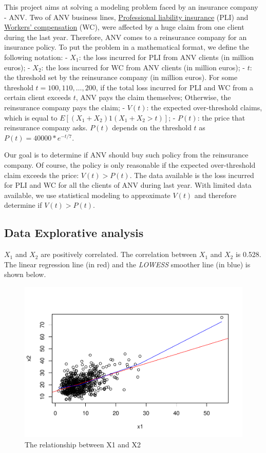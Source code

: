 \documentclass[11pt,]{article}
\begin{document}
This project aims at solving a modeling problem faced by an insurance
company - ANV. Two of ANV business lines,
\href{https://en.wikipedia.org/wiki/Professional_liability_insurance}{Professional
liability insurance} (PLI) and
\href{https://en.wikipedia.org/wiki/Workers\%27_compensation}{Workers'
compensation} (WC), were affected by a huge claim from one client during
the last year. Therefore, ANV comes to a reinsurance company for an
insurance policy. To put the problem in a mathematical format, we define
the following notation: - \(X_1\): the loss incurred for PLI from ANV
clients (in million euros); - \(X_2\): the loss incurred for WC from ANV
clients (in million euros); - \(t\): the threshold set by the
reinsurance company (in million euros). For some threshold
\(t = 100,110,…,200\), if the total loss incurred for PLI and WC from a
certain client exceeds \(t\), ANV pays the claim themselves; Otherwise,
the reinsurance company pays the claim; - \(V(t)\): the expected
over-threshold claims, which is equal to \(E[(X_1+X_2)1(X_1+X_2>t)]\); -
\(P(t)\): the price that reinsurance company asks. \(P(t)\) depends on
the threshold \(t\) as \(P(t)=40000 * e^{-t/7}\).

Our goal is to determine if ANV should buy such policy from the
reinsurance company. Of course, the policy is only reasonable if the
expected over-threshold claim exceeds the price: \(V(t) > P(t)\). The
data available is the loss incurred for PLI and WC for all the clients
of ANV during last year. With limited data available, we use statistical
modeling to approximate \(V(t)\) and therefore determine if
\(V(t) > P(t)\).

\hypertarget{data-explorative-analysis}{%
\subsection{Data Explorative analysis}\label{data-explorative-analysis}}

\(X_1\) and \(X_2\) are positively correlated. The correlation between
\(X_1\) and \(X_2\) is 0.528. The linear regression line (in red) and
the \emph{LOWESS} smoother line (in blue) is shown below.

\begin{figure}
\centering
\includegraphics{figs/unnamed-chunk-2.pdf}
\caption{The relationship between X1 and X2}
\end{figure}
\end{document}
